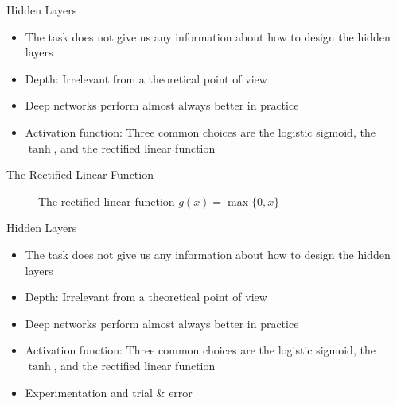 \documentclass{beamer}
\begin{document}
	\begin{frame}{Hidden Layers}
		\begin{itemize}
			\item <1-> The task does not give us any information about how to design the hidden layers
			\item <2-> Depth: Irrelevant from a theoretical point of view
			\item <3-> Deep networks perform almost always better in practice
			\item <4-> Activation function: Three common choices are the logistic sigmoid, the $\tanh$, and the rectified linear function
		\end{itemize}
	\end{frame}
	\begin{frame}{The Rectified Linear Function}
		\begin{figure}
			\begin{center}
				
			\end{center}
			\caption{The rectified linear function $g(x) = \max\{0,x\}$}
			\label{fig:sigmoid}
		\end{figure}
	\end{frame}
	\begin{frame}{Hidden Layers}
		\begin{itemize}
			\item <1-> The task does not give us any information about how to design the hidden layers
			\item <1-> Depth: Irrelevant from a theoretical point of view
			\item <1-> Deep networks perform almost always better in practice
			\item <1-> Activation function: Three common choices are the logistic sigmoid, the $\tanh$, and the rectified linear function
			\item <1-> Experimentation and trial \& error
		\end{itemize}
	\end{frame}
\end{document}
